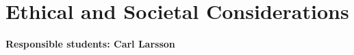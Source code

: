\section{Ethical and Societal Considerations}
\label{section:ethical_and_societal_considerations}


\textbf{Responsible students: Carl Larsson}


